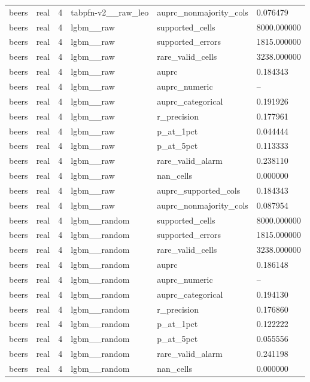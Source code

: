\begin{tabular}{llllll}
beers & real & 4 & tabpfn-v2\_\_raw\_leo & auprc\_nonmajority\_cols & 0.076479 \\
beers & real & 4 & lgbm\_\_raw & supported\_cells & 8000.000000 \\
beers & real & 4 & lgbm\_\_raw & supported\_errors & 1815.000000 \\
beers & real & 4 & lgbm\_\_raw & rare\_valid\_cells & 3238.000000 \\
beers & real & 4 & lgbm\_\_raw & auprc & 0.184343 \\
beers & real & 4 & lgbm\_\_raw & auprc\_numeric & -- \\
beers & real & 4 & lgbm\_\_raw & auprc\_categorical & 0.191926 \\
beers & real & 4 & lgbm\_\_raw & r\_precision & 0.177961 \\
beers & real & 4 & lgbm\_\_raw & p\_at\_1pct & 0.044444 \\
beers & real & 4 & lgbm\_\_raw & p\_at\_5pct & 0.113333 \\
beers & real & 4 & lgbm\_\_raw & rare\_valid\_alarm & 0.238110 \\
beers & real & 4 & lgbm\_\_raw & nan\_cells & 0.000000 \\
beers & real & 4 & lgbm\_\_raw & auprc\_supported\_cols & 0.184343 \\
beers & real & 4 & lgbm\_\_raw & auprc\_nonmajority\_cols & 0.087954 \\
beers & real & 4 & lgbm\_\_random & supported\_cells & 8000.000000 \\
beers & real & 4 & lgbm\_\_random & supported\_errors & 1815.000000 \\
beers & real & 4 & lgbm\_\_random & rare\_valid\_cells & 3238.000000 \\
beers & real & 4 & lgbm\_\_random & auprc & 0.186148 \\
beers & real & 4 & lgbm\_\_random & auprc\_numeric & -- \\
beers & real & 4 & lgbm\_\_random & auprc\_categorical & 0.194130 \\
beers & real & 4 & lgbm\_\_random & r\_precision & 0.176860 \\
beers & real & 4 & lgbm\_\_random & p\_at\_1pct & 0.122222 \\
beers & real & 4 & lgbm\_\_random & p\_at\_5pct & 0.055556 \\
beers & real & 4 & lgbm\_\_random & rare\_valid\_alarm & 0.241198 \\
beers & real & 4 & lgbm\_\_random & nan\_cells & 0.000000 \\

\end{tabular}
